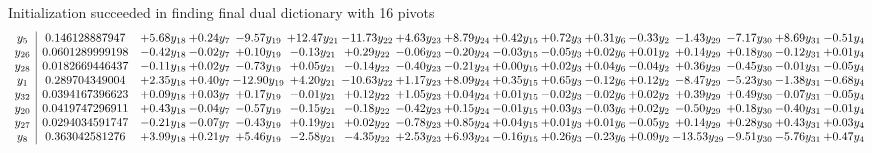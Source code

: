 \documentclass[9pt]{article}
\begin{document}
Initialization succeeded in finding final dual dictionary with 16 pivots
\[\begin{array}{c| c c@{\hskip 2pt} c@{\hskip 2pt} c@{\hskip 2pt} c@{\hskip 2pt} c@{\hskip 2pt} c@{\hskip 2pt} c@{\hskip 2pt} c@{\hskip 2pt} c@{\hskip 2pt} c@{\hskip 2pt} c@{\hskip 2pt} c@{\hskip 2pt} c@{\hskip 2pt} c@{\hskip 2pt} c@{\hskip 2pt} }
 y_{5}   &  0.146128887947 & +  5.68 y_{18} & +  0.24 y_{7} & -9.57 y_{19} & + 12.47 y_{21} & -11.73 y_{22} & +  4.63 y_{23} & +  8.79 y_{24} & +  0.42 y_{15} & +  0.72 y_{3} & +  0.31 y_{6} & -0.33 y_{2} & -1.43 y_{29} & -7.17 y_{30} & +  8.69 y_{31} & -0.51 y_{4}\\
 y_{26}   &  0.0601289999198 & -0.42 y_{18} & -0.02 y_{7} & +  0.10 y_{19} & -0.13 y_{21} & +  0.29 y_{22} & -0.06 y_{23} & -0.20 y_{24} & -0.03 y_{15} & -0.05 y_{3} & +  0.02 y_{6} & +  0.01 y_{2} & +  0.14 y_{29} & +  0.18 y_{30} & -0.12 y_{31} & +  0.01 y_{4}\\
 y_{28}   &  0.0182669446437 & -0.11 y_{18} & +  0.02 y_{7} & -0.73 y_{19} & +  0.05 y_{21} & -0.14 y_{22} & -0.40 y_{23} & -0.21 y_{24} & +  0.00 y_{15} & +  0.02 y_{3} & +  0.04 y_{6} & -0.04 y_{2} & +  0.36 y_{29} & -0.45 y_{30} & -0.01 y_{31} & -0.05 y_{4}\\
 y_{1}   &  0.289704349004 & +  2.35 y_{18} & +  0.40 y_{7} & -12.90 y_{19} & +  4.20 y_{21} & -10.63 y_{22} & +  1.17 y_{23} & +  8.09 y_{24} & +  0.35 y_{15} & +  0.65 y_{3} & -0.12 y_{6} & +  0.12 y_{2} & -8.47 y_{29} & -5.23 y_{30} & -1.38 y_{31} & -0.68 y_{4}\\
 y_{32}   &  0.0394167396623 & +  0.09 y_{18} & +  0.03 y_{7} & +  0.17 y_{19} & -0.01 y_{21} & +  0.12 y_{22} & +  1.05 y_{23} & +  0.04 y_{24} & +  0.01 y_{15} & -0.02 y_{3} & -0.02 y_{6} & +  0.02 y_{2} & +  0.39 y_{29} & +  0.49 y_{30} & -0.07 y_{31} & -0.05 y_{4}\\
 y_{20}   &  0.0419747296911 & +  0.43 y_{18} & -0.04 y_{7} & -0.57 y_{19} & -0.15 y_{21} & -0.18 y_{22} & -0.42 y_{23} & +  0.15 y_{24} & -0.01 y_{15} & +  0.03 y_{3} & -0.03 y_{6} & +  0.02 y_{2} & -0.50 y_{29} & +  0.18 y_{30} & -0.40 y_{31} & -0.01 y_{4}\\
 y_{27}   &  0.0294034591747 & -0.21 y_{18} & -0.07 y_{7} & -0.43 y_{19} & +  0.19 y_{21} & +  0.02 y_{22} & -0.78 y_{23} & +  0.85 y_{24} & +  0.04 y_{15} & +  0.01 y_{3} & +  0.01 y_{6} & -0.05 y_{2} & +  0.14 y_{29} & +  0.28 y_{30} & +  0.43 y_{31} & +  0.03 y_{4}\\
 y_{8}   &  0.363042581276 & +  3.99 y_{18} & +  0.21 y_{7} & +  5.46 y_{19} & -2.58 y_{21} & -4.35 y_{22} & +  2.53 y_{23} & +  6.93 y_{24} & -0.16 y_{15} & +  0.26 y_{3} & -0.23 y_{6} & +  0.09 y_{2} & -13.53 y_{29} & -9.51 y_{30} & -5.76 y_{31} & +  0.47 y_{4}\\

\end{array}\]
\end{document}
